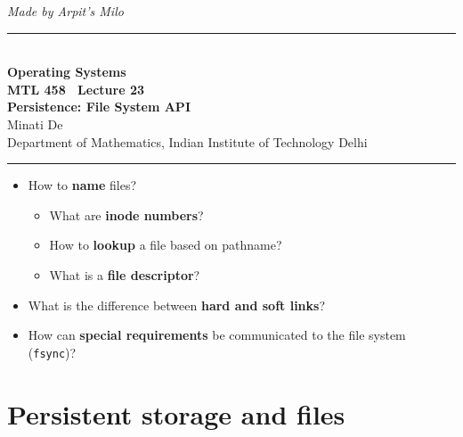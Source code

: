 \documentclass[11pt,a4paper]{article}
\begin{document}
\begin{center}
{\small\itshape Made by Arpit's Milo}\\[0.3em]
{\color{rulegray}\rule{\textwidth}{1.1pt}}\\[0.45em]
{\LARGE\bfseries Operating Systems}\\[0.25em]
{\Large\bfseries MTL 458 \textperiodcentered\ Lecture 23}\\[0.35em]
{\LARGE\bfseries Persistence: File System API}\\[0.35em]
{\large Minati De}\\[0.15em]
{\normalsize Department of Mathematics, Indian Institute of Technology Delhi}\\[0.35em]
{\color{rulegray}\rule{\textwidth}{1.1pt}}
\end{center}

\vspace{0.4em}
\begin{keybox}
\begin{itemize}
  \item How to \textbf{name} files?
  \begin{itemize}
    \item What are \textbf{inode numbers}?
    \item How to \textbf{lookup} a file based on pathname?
    \item What is a \textbf{file descriptor}?
  \end{itemize}
  \item What is the difference between \textbf{hard and soft links}?
  \item How can \textbf{special requirements} be communicated to the file
        system (\texttt{fsync})?
\end{itemize}
\end{keybox}

\tableofcontents
\vspace{0.6em}
\noindent{\color{rulegray}\rule{\textwidth}{0.4pt}}

\section{Persistent storage and files}
\end{document}

